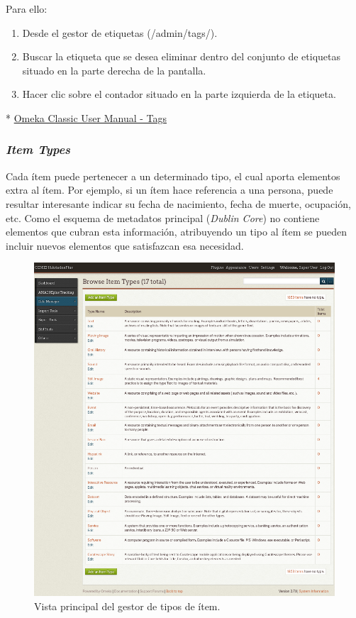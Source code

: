 \documentclass[
]{article}
\providecommand{\tightlist}{%
  \setlength{\itemsep}{0pt}\setlength{\parskip}{0pt}}
\begin{document}
Para ello:

\begin{enumerate}
\def\labelenumi{\arabic{enumi}.}
\tightlist
\item
  Desde el gestor de etiquetas ({/admin/tags/}).
\item
  Buscar la etiqueta que se desea eliminar dentro del conjunto de
  etiquetas situado en la parte derecha de la pantalla.
\item
  Hacer clic sobre el contador situado en la parte izquierda de la
  etiqueta.
\end{enumerate}

* \href{https://omeka.org/classic/docs/Content/Tags/}{Omeka Classic User
Manual - Tags}

\hypertarget{item-types}{%
\subsubsection{\texorpdfstring{\emph{Item
Types}}{Item Types}}\label{item-types}}

Cada ítem puede pertenecer a un determinado tipo, el cual aporta
elementos extra al ítem. Por ejemplo, si un ítem hace referencia a una
persona, puede resultar interesante indicar su fecha de nacimiento,
fecha de muerte, ocupación, etc. Como el esquema de metadatos principal
(\emph{Dublin Core}) no contiene elementos que cubran esta información,
atribuyendo un tipo al ítem se pueden incluir nuevos elementos que
satisfazcan esa necesidad.

\begin{figure}
\hypertarget{item-type-view}{%
\centering
\includegraphics{../_static/images/item-type-view.png}
\caption{Vista principal del gestor de tipos de
ítem.}\label{item-type-view}
}
\end{figure}
\end{document}
